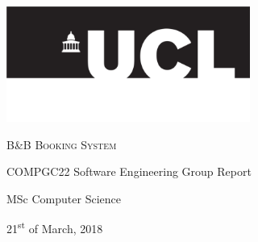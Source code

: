 \thispagestyle{titlepage}

\begin{center}

  \includegraphics[width=8cm]{img/ucl_logo.png} \\[0.5em]

  \newlength{\parSepLength}
  \setlength{\parSepLength}{10ex}

  \Large
  \centering

  \thinRule\par
  \par\vspace{0.15\parSepLength}
  \begin{minipage}{\textwidth}
    \centering
    \fontsize{40pt}{36pt}\selectfont\titleColor\scshape
    B\&B Booking System
  \end{minipage}
  \par\vspace{0.25\parSepLength}
  \par\thinRule

  \vspace{0.125\parSepLength}

  \begin{minipage}{\textwidth}
    \centering
    \small
    COMPGC22 Software Engineering Group Report
  \end{minipage}
  
  \vspace{0.125\parSepLength}

  \begin{minipage}{\textwidth}
    \centering
    \small
    MSc Computer Science
  \end{minipage}
  
   \vspace{0.125\parSepLength}

  \begin{minipage}{\textwidth}
    \centering
    \small
    21\textsuperscript{st} of March, 2018 
  \end{minipage}


  \vfill


\end{center}
